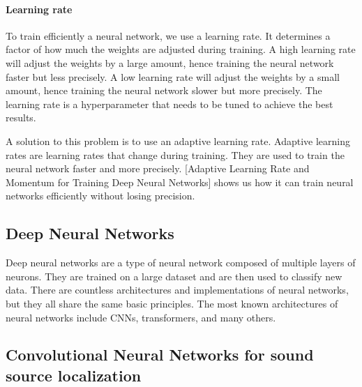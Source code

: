 \paragraph{Learning rate}

To train efficiently a neural network, we use a learning rate. It determines a factor of how much the weights are adjusted during training. A high learning rate will adjust the weights by a large amount, hence training the neural network faster but less precisely. A low learning rate will adjust the weights by a small amount, hence training the neural network slower but more precisely. The learning rate is a hyperparameter that needs to be tuned to achieve the best results.

A solution to this problem is to use an adaptive learning rate. Adaptive learning rates are learning rates that change during training. They are used to train the neural network faster and more precisely. [Adaptive Learning Rate and Momentum for Training Deep Neural Networks]\cite{hao2021adaptive} shows us how it can train neural networks efficiently without losing precision. 

\subsection{Deep Neural Networks}

Deep neural networks are a type of neural network composed of multiple layers of neurons\cite{Schmidhuber_2015}. They are trained on a large dataset and are then used to classify new data. There are countless architectures \cite{LIU201711} and implementations of neural networks, but they all share the same basic principles. The most known architectures of neural networks include CNNs\cite{oshea2015introduction}, transformers\cite{vaswani2017attention}, and many others.

\subsection{Convolutional Neural Networks for sound source localization}
\label{sec:cnn_for_ssl}

